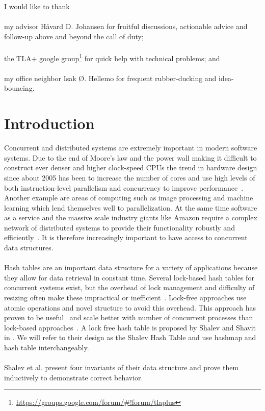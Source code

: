 \documentclass{uit-thesis}
\begin{document}
\begin{acknowledgement}
    I would like to thank\\\\
    my advisor Håvard D. Johansen for fruitful discussions, actionable advice and follow-up above and beyond the call of duty;\\\\
    the TLA+ google group\footnote{\url{https://groups.google.com/forum/\#!forum/tlaplus}} for quick help with technical problems; and\\\\
    my office neighbor Isak Ø. Hellemo for frequent rubber-ducking and idea-bouncing.
\end{acknowledgement}

\mainmatter

\chapter{Introduction}
Concurrent and distributed systems are extremely important in modern software systems. Due to the end of Moore's law and the power wall making it difficult to construct ever denser and higher clock-speed CPUs the trend in hardware design since about 2005 has been to increase the number of cores and use high levels of both instruction-level parallelism and concurrency to improve performance~\cite{Tanenbaum2014}. Another example are areas of computing such as image processing and machine learning which lend themselves well to parallelization. At the same time software as a service and the massive scale industry giants like Amazon require a complex network of distributed systems to provide their functionality robustly and efficiently~\cite{Amazon2015}. It is therefore increasingly important to have access to concurrent data structures.
\\\\
Hash tables are an important data structure for a variety of applications because they allow for data retrieval in constant time. Several lock-based hash tables for concurrent systems exist, but the overhead of lock management and difficulty of resizing often make these impractical or inefficient~\cite{Shalev2006}. Lock-free approaches use atomic operations and novel structure to avoid this overhead. This approach has proven to be useful~\cite{lock-free-structures2013} and scale better with number of concurrent processes than lock-based approaches~\cite{Duarte-Haskell2016}. A lock free hash table is proposed by Shalev and Shavit in \cite{Shalev2006}. We will refer to their design as the Shalev Hash Table and use hashmap and hash table interchangeably.
\\\\
Shalev et al. present four invariants of their data structure and prove them inductively to demonstrate correct behavior.
\end{document}
